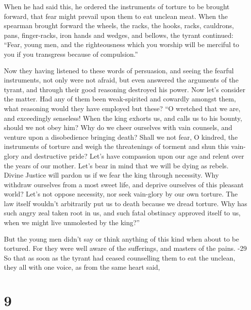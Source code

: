  When he had said this, he ordered the instruments of
torture to be brought forward, that fear might prevail upon them to eat
unclean meat.  When the spearman brought forward the
wheels, the racks, the hooks, racks, cauldrons, pans, finger-racks, iron
hands and wedges, and bellows, the tyrant continued: 
``Fear, young men, and the righteousness which you worship will be
merciful to you if you transgress because of compulsion.''

 Now they having listened to these words of persuasion, and
seeing the fearful instruments, not only were not afraid, but even
answered the arguments of the tyrant, and through their good reasoning
destroyed his power.  Now let's consider the matter. Had
any of them been weak-spirited and cowardly amongst them, what reasoning
would they have employed but these?  ``O wretched that we
are, and exceedingly senseless! When the king exhorts us, and calls us
to his bounty, should we not obey him?  Why do we cheer
ourselves with vain counsels, and venture upon a disobedience bringing
death?  Shall we not fear, O kindred, the instruments of
torture and weigh the threatenings of torment and shun this vain-glory
and destructive pride?  Let's have compassion upon our age
and relent over the years of our mother.  Let's bear in
mind that we will be dying as rebels.  Divine Justice will
pardon us if we fear the king through necessity.  Why
withdraw ourselves from a most sweet life, and deprive ourselves of this
pleasant world?  Let's not oppose necessity, nor seek
vain-glory by our own torture.  The law itself wouldn't
arbitrarily put us to death because we dread torture.  Why
has such angry zeal taken root in us, and such fatal obstinacy approved
itself to us, when we might live unmolested by the king?''

 But the young men didn't say or think anything of this
kind when about to be tortured.  For they were well aware
of the sufferings, and masters of the pains. -29 So that as
soon as the tyrant had ceased counselling them to eat the unclean, they
all with one voice, as from the same heart said,

\hypertarget{section-8}{%
\section{9}\label{section-8}}

